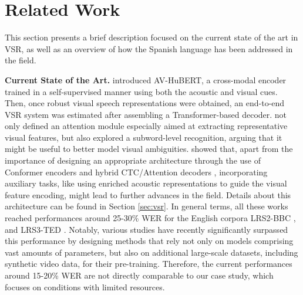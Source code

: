 \section{Related Work}
\label{sec:related}

This section presents a brief description focused on the current state of the art in VSR, as well as an overview of how the Spanish language has been addressed in the field.

\noindent\textbf{Current State of the Art.} \cite{shi2022learning} introduced AV-HuBERT, a cross-modal encoder trained in a self-supervised manner using both the acoustic and visual cues. Then, once robust visual speech representations were obtained, an end-to-end VSR system was estimated after assembling a Transformer-based decoder. \cite{prajwal2021sub} not only defined an attention module especially aimed at extracting representative visual features, but also explored a subword-level recognition, arguing that it might be useful to better model visual ambiguities. \cite{ma2022visual} showed that, apart from the importance of designing an appropriate architecture through the use of Conformer encoders \citep{gulati20_interspeech} and hybrid CTC/Attention decoders \citep{watanabe2017ctcattention}, incorporating auxiliary tasks, like using enriched acoustic representations to guide the visual feature encoding, might lead to further advances in the field. Details about this architecture can be found in Section \ref{sec:vsr}. In general terms, all these works reached performances around 25-30\% WER for the English corpora LRS2-BBC \citep{son2017lrs2}, and LRS3-TED \citep{afouras2018lrs3}. Notably, various studies \citep{ma2023auto,liu2023synthvsr} have recently significantly surpassed this performance by designing methods that rely not only on models comprising vast amounts of parameters, but also on additional large-scale datasets, including synthetic video data, for their pre-training. Therefore, the current performances around 15-20\% WER are not directly comparable to our case study, which focuses on conditions with limited resources.

